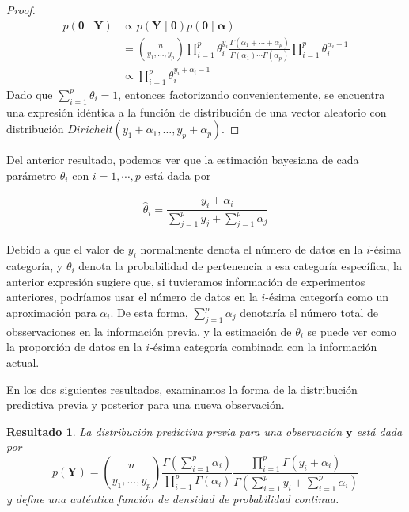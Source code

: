 \documentclass[
  10pt,
  spanish,
]{book}
\newtheorem{proposition}{Resultado}[chapter]
\theoremstyle{definition}
\theoremstyle{definition}
\theoremstyle{definition}
\theoremstyle{definition}
\theoremstyle{remark}
\begin{document}
\begin{proof}
{}\begin{align*}
p(\boldsymbol \theta\mid \mathbf{Y})&\propto p(\mathbf{Y} \mid \boldsymbol \theta)p(\boldsymbol \theta\mid \boldsymbol \alpha)\\
&=\binom{n}{y_1,\ldots,y_p}\prod_{i=1}^p\theta_i^{y_i}\frac{\Gamma(\alpha_1+\cdots+\alpha_p)}{\Gamma(\alpha_1)
  \cdots\Gamma(\alpha_p)}
\prod_{i=1}^p\theta_i^{\alpha_i-1}\\
&\propto \prod_{i=1}^p\theta_i^{y_i+\alpha_i-1}
\end{align*}
Dado que \(\sum_{i=1}^p\theta_i=1\), entonces factorizando convenientemente, se encuentra una expresión idéntica a la función de distribución de una vector aleatorio con distribución \(Dirichelt(y_1+\alpha_1,\ldots,y_p+\alpha_p)\).
\end{proof}

Del anterior resultado, podemos ver que la estimación bayesiana de cada parámetro \(\theta_i\) con \(i=1,\cdots,p\) está dada por

\begin{align*}
\hat{\theta}_i=\dfrac{y_i+\alpha_i}{\sum_{j=1}^py_j+\sum_{j=1}^p\alpha_j}
\end{align*}

Debido a que el valor de \(y_i\) normalmente denota el número de datos en la \(i\)-ésima categoría, y \(\theta_i\) denota la probabilidad de pertenencia a esa categoría específica, la anterior expresión sugiere que, si tuvieramos información de experimentos anteriores, podríamos usar el número de datos en la \(i\)-ésima categoría como un aproximación para \(\alpha_i\). De esta forma, \(\sum_{j=1}^p\alpha_j\) denotaría el número total de obsservaciones en la información previa, y la estimación de \(\theta_i\) se puede ver como la proporción de datos en la \(i\)-ésima categoría combinada con la información actual.

En los dos siguientes resultados, examinamos la forma de la distribución predictiva previa y posterior para una nueva observación.

\begin{proposition}
\protect\hypertarget{prp:unnamed-chunk-66}{}{\label{prp:unnamed-chunk-66} }La distribución predictiva previa para una observación \(\mathbf{y}\) está dada por
\begin{equation}
p(\mathbf{Y})=\binom{n}{y_1,\ldots,y_p} \frac{\Gamma(\sum_{i=1}^p\alpha_i)}{\prod_{i=1}^p\Gamma(\alpha_i)}
\frac{\prod_{i=1}^p\Gamma(y_i+\alpha_i)}{\Gamma(\sum_{i=1}^py_i+\sum_{i=1}^p\alpha_i)}
\end{equation}
y define una auténtica función de densidad de probabilidad continua.
\end{proposition}
\end{document}
